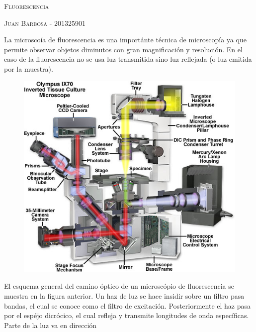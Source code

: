 \documentclass[addpoints,12pt]{exam}
\begin{document}
	\begin{center}
		\LARGE\scshape{Fluorescencia}
		
		\vspace{1cm}
		\large\scshape{Juan Barbosa - 201325901}
	\end{center}

	La microsco\'ia de fluorescencia es una importánte técnica de microscop\'ia ya que permite observar objetos diminutos con gran magnificación y resolución. En el caso de la fluorescencia no se usa luz transmitida sino luz reflejada (o luz emitida por la muestra).
	
	\begin{figure}[h]
		\centering
		\includegraphics[width = 0.5\linewidth]{lightpaths.jpg}
	\end{figure}
	
	El esquema general del camino óptico de un microscópio de fluorescencia se muestra en la figura anterior. Un haz de luz se hace insidir sobre un filtro pasa bandas, el cual se conoce como el filtro de excitación. Posteriormente el haz pasa por el espéjo dicrócico, el cual refleja y transmite longitudes de onda específicas. Parte de la luz va en dirección
	
	
\end{document}
